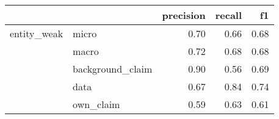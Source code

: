 \begin{tabular}{llrrr}
\toprule
            &           &  precision &  recall &   f1 \\
\midrule
entity\_weak & micro &       0.70 &    0.66 & 0.68 \\
            & macro &       0.72 &    0.68 & 0.68 \\
            & background\_claim &       0.90 &    0.56 & 0.69 \\
            & data &       0.67 &    0.84 & 0.74 \\
            & own\_claim &       0.59 &    0.63 & 0.61 \\
\bottomrule
\end{tabular}
